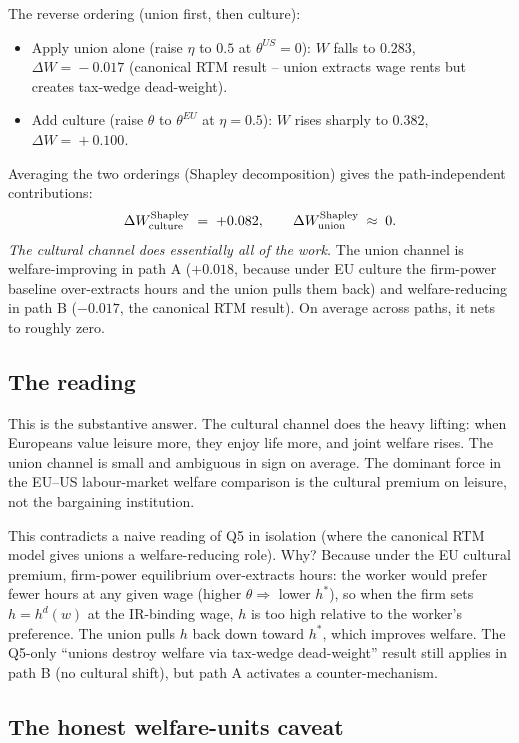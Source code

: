 \documentclass[11pt,a4paper]{article}
\begin{document}
The reverse ordering (union first, then culture):
\begin{itemize}
\item Apply union alone (raise $\eta$ to $0.5$ at $\theta^{US}\!=\!0$):
$W$ falls to $0.283$, $\Delta W\!=\!-0.017$ (canonical RTM result --
union extracts wage rents but creates tax-wedge dead-weight).
\item Add culture (raise $\theta$ to $\theta^{EU}$ at $\eta\!=\!0.5$):
$W$ rises sharply to $0.382$, $\Delta W\!=\!+0.100$.
\end{itemize}
Averaging the two orderings (Shapley decomposition) gives the
path-independent contributions:
\[
\Delta W^{\rm Shapley}_{\rm culture}\;=\;+0.082,
\qquad
\Delta W^{\rm Shapley}_{\rm union}\;\approx\;0.
\]
\emph{The cultural channel does essentially all of the work.} The
union channel is welfare-improving in path A ($+0.018$, because under
EU culture the firm-power baseline over-extracts hours and the union
pulls them back) and welfare-reducing in path B ($-0.017$, the
canonical RTM result). On average across paths, it nets to roughly
zero.

\subsection{The reading}

This is the substantive answer. The cultural channel does the heavy
lifting: when Europeans value leisure more, they enjoy life more, and
joint welfare rises. The union channel is small and ambiguous in
sign on average. The dominant force in the EU--US labour-market
welfare comparison is the cultural premium on leisure, not the
bargaining institution.

This contradicts a naive reading of Q5 in isolation (where the canonical
RTM model gives unions a welfare-reducing role). Why? Because under the
EU cultural premium, firm-power equilibrium over-extracts hours: the
worker would prefer fewer hours at any given wage (higher
$\theta\!\Rightarrow\!$ lower $h^\ast$), so when the firm sets
$h\!=\!h^d(w)$ at the IR-binding wage, $h$ is too high relative to the
worker's preference. The union pulls $h$ back down toward $h^\ast$,
which improves welfare. The Q5-only ``unions destroy welfare via
tax-wedge dead-weight'' result still applies in path B (no cultural
shift), but path A activates a counter-mechanism.

\subsection{The honest welfare-units caveat}
\end{document}
